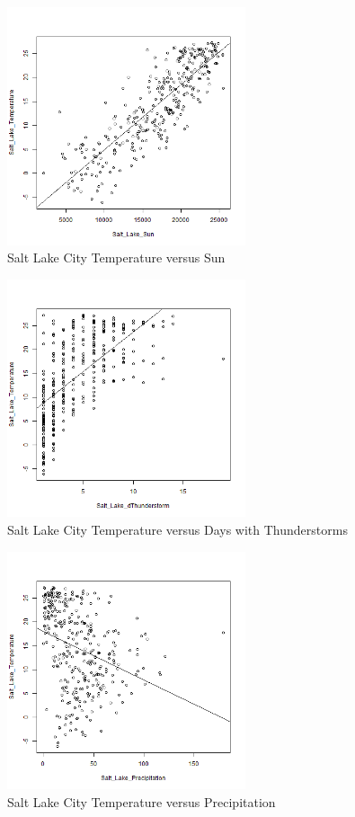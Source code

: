 \begin{figure}
  \centering
  \includegraphics[width=7cm]{../data/img/Temp_vs_sun.PNG}
  \caption{Salt Lake City Temperature versus Sun}
  \label{fig:temp_vs_sun}
\end{figure}

\begin{figure}
  \centering
  \includegraphics[width=7cm]{../data/img/Temp_vs_dThunderstorm.PNG}
  \caption{Salt Lake City Temperature versus Days with Thunderstorms}
  \label{fig:temp_vs_dthunderstorms}
\end{figure}

\begin{figure}
  \centering
  \includegraphics[width=7cm]{../data/img/Temp_vs_Precipitation.PNG}
  \caption{Salt Lake City Temperature versus Precipitation}
  \label{fig:temp_vs_precipitation}
\end{figure}


